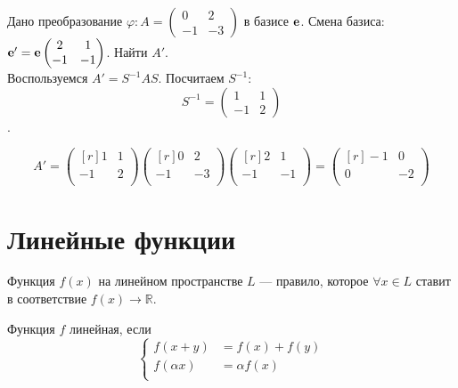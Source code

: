 \begin{prim} 
	Дано преобразование $\varphi\colon A = \begin{pmatrix} 0 & 2 \\ -1 & -3 \end{pmatrix}$ в базисе $\bf e$. Смена базиса: $\bf e' = \bf e \begin{pmatrix} 2 & 1 \\ -1 & -1 \end{pmatrix}$.
	Найти $A'$.\\
	
	Воспользуемся $A'=S^{-1}AS$. Посчитаем $S^{-1}$:\\
	$$S^{-1} =
	\begin{pmatrix} 1 & 1 \\ -1 & 2 \end{pmatrix}$$.
\end{prim}
$$
A'=
\begin{pmatrix*}[r]
1 & 1\\
-1 & 2\\
\end{pmatrix*}
\begin{pmatrix*}[r]
0 & 2\\
-1 & -3\\
\end{pmatrix*}
\begin{pmatrix*}[r]
2 & 1\\
-1 & -1\\
\end{pmatrix*}
=
\begin{pmatrix*}[r]
-1 & 0\\
0 & -2\\
\end{pmatrix*}
$$
\section{Линейные функции}
\begin{definition}
	\textsf{Функция} $f(x)$ на линейном пространстве $L$ --- правило, которое $\forall x \in L$ ставит в соответствие $f(x) \rightarrow \mathbb{R} $.
	
	Функция $f$ линейная, если 
	$$
	\left\{
	\begin{array}{rl} %
	f(x+y)&=f(x)+f(y)\\
	f(\alpha x)&=\alpha f(x)\\
	\end{array}
	\right.
	$$
\end{definition}


